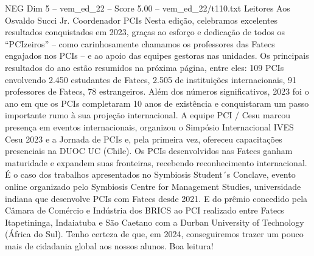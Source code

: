 \begin{textsample}{NEG Dim 5 – vem\_ed\_22 – Score 5.00 – vem\_ed\_22/t110.txt}  \label{ex:f5_neg_085}
Leitores Aos Osvaldo Succi Jr.
Coordenador PCIs Nesta edição, celebramos excelentes resultados conquistados em 2023, graças ao esforço e dedicação de todos os “PCIzeiros” – como carinhosamente chamamos os professores das Fatecs engajados nos PCIs – e ao apoio das equipes gestoras nas unidades.
Os principais resultados do ano estão resumidos na próxima página, entre eles: 109 PCIs envolvendo 2.450 estudantes de Fatecs, 2.505 de instituições internacionais, 91 professores de Fatecs, 78 estrangeiros.
Além dos números significativos, 2023 foi o ano em que os PCIs completaram 10 anos de existência e conquistaram um passo importante rumo à sua projeção internacional.
A equipe PCI / Cesu marcou presença em eventos internacionais, organizou o Simpósio Internacional IVES Cesu 2023 e a Jornada de PCIs e, pela primeira vez, ofereceu capacitações presenciais na DUOC UC (Chile).
Os PCIs desenvolvidos nas Fatecs ganham maturidade e expandem suas fronteiras, recebendo reconhecimento internacional.
É o caso dos trabalhos apresentados no Symbiosis Student´s Conclave, evento online organizado pelo Symbiosis Centre for Management Studies, universidade indiana que desenvolve PCIs com Fatecs desde 2021.
E do prêmio concedido pela Câmara de Comércio e Indústria dos BRICS ao PCI realizado entre Fatecs Itapetininga, Indaiatuba e São Caetano com a Durban University of Technology (África do Sul).
Tenho certeza de que, em 2024, conseguiremos trazer um pouco mais de cidadania global aos nossos alunos.
Boa leitura!

\end{textsample}
